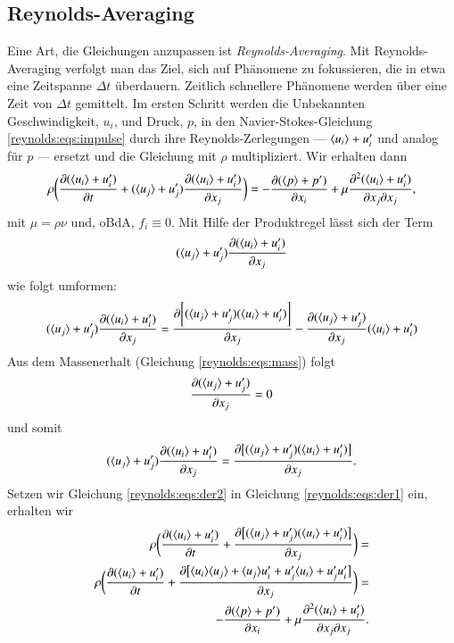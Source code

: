 \subsection{Reynolds-Averaging}
Eine Art, die Gleichungen anzupassen ist \emph{Reynolds-Averaging}. Mit Reynolds-Averaging verfolgt
man das Ziel, sich auf Phänomene zu fokussieren, die in etwa eine Zeitspanne $\Delta t$ überdauern.
Zeitlich schnellere Phänomene werden über eine Zeit von $\Delta t$ gemittelt.
%
Im ersten Schritt werden die Unbekannten Geschwindigkeit, $u_i$, und Druck, $p$, in den Navier-Stokes-Gleichung
\eqref{reynolds:eqs:impulse} durch ihre Reynolds-Zerlegungen --- $\rdecomp{u_i}$ und analog für $p$ --- ersetzt und die Gleichung
mit $\rho$ multipliziert. Wir erhalten dann
%
\begin{equation}
    \label{reynolds:eqs:der1}
    \rho \biggl( \frac{\partial ( \rdecomp{u_i} )}{\partial t} + (\rdecomp{u_j} ) \frac{\partial ( \rdecomp{u_i} )}{\partial x_j} \biggr) =
        - \frac{\partial ( \rdecomp{p} )}{\partial x_i} + 
        \mu \frac{\partial^2 ( \rdecomp{u_i} )}{\partial x_j \partial x_j},
\end{equation}
%
mit $\mu = \rho \nu$ und, oBdA, $f_i \equiv 0$.
%
Mit Hilfe der Produktregel lässt sich der Term
%
$$( \rdecomp{u_j} ) \frac{\partial ( \rdecomp{u_i} )}{\partial x_j}$$
%
wie folgt umformen:
%
\begin{equation}
    ( \rdecomp{u_j} ) \frac{\partial ( \rdecomp{u_i} )}{\partial x_j} =
        \frac{\partial \biggl[ ( \rdecomp{u_j} ) ( \rdecomp{u_i} ) \biggr]}{\partial x_j}
        - \frac{\partial ( \rdecomp{u_j} )}{\partial x_j} ( \rdecomp{u_i} )
\end{equation}
%
Aus dem Massenerhalt (Gleichung \eqref{reynolds:eqs:mass}) folgt
%
\begin{equation}
    \frac{\partial ( \rdecomp{u_j} )}{\partial x_j} = 0
\end{equation}
%
und somit
%
\begin{equation}
    \label{reynolds:eqs:der2}
    ( \rdecomp{u_j} ) \frac{\partial ( \rdecomp{u_i} )}{\partial x_j} =
        \frac{\partial \bigl[ ( \rdecomp{u_j} ) ( \rdecomp{u_i} ) \bigr]}{\partial x_j}.
\end{equation}
%
Setzen wir Gleichung \eqref{reynolds:eqs:der2} in Gleichung \eqref{reynolds:eqs:der1} ein, erhalten wir
%
\begin{align}
    \rho \biggl(
            \frac{\partial ( \rdecomp{u_i} )}{\partial t} +
            \frac{\partial \bigl[ ( \rdecomp{u_j} ) ( \rdecomp{u_i} ) \bigr]}{\partial x_j}
        \biggr) = \\
    \rho \biggl(
            \frac{\partial ( \rdecomp{u_i} )}{\partial t} +
            \frac{\partial \bigl[ \ravg{u_i} \ravg{u_j}  + \ravg{u_j} u_i' + u_j' \ravg{u_i} + u_j' u_i' \bigr]}{\partial x_j}
        \biggr) = \\
    - \frac{\partial ( \rdecomp{p} )}{\partial x_i} + 
    \mu \frac{\partial^2 ( \rdecomp{u_i} )}{\partial x_j \partial x_j}.
\end{align}
